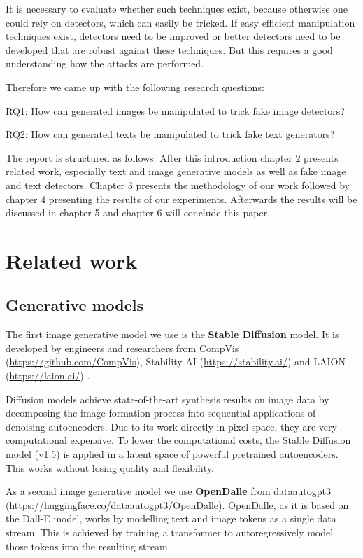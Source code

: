 \documentclass{article} %
\begin{document}
It is necessary to evaluate whether such techniques exist, because otherwise one could rely on detectors, which can easily be tricked. If easy efficient manipulation techniques exist, detectors need to be improved or better detectors need to be developed that are robust against these techniques. But this requires a good understanding how the attacks are performed.

Therefore we came up with the following research questions:


RQ1: How can generated images be manipulated to trick fake image detectors?


RQ2: How can generated texts be manipulated to trick fake text generators?


The report is structured as follows: After this introduction chapter 2 presents related work, especially text and image generative models as well as fake image and text detectors. Chapter 3 presents the methodology of our work followed by chapter 4 presenting the results of our experiments. Afterwards the results will be discussed in chapter 5 and chapter 6 will conclude this paper.

\section{Related work}

\subsection{Generative models}

The first image generative model we use is the \textbf{Stable Diffusion} model. It is developed by engineers and researchers from CompVis (\url{https://github.com/CompVis}), Stability AI (\url{https://stability.ai/}) and LAION (\url{https://laion.ai/}) \cite{patil2022stable}.

Diffusion models achieve state-of-the-art synthesis results on image data by decomposing the image formation process into sequential applications of denoising autoencoders. Due to its work directly in pixel space, they are very computational expensive. To lower the computational costs, the Stable Diffusion model (v1.5) is applied in a latent space of powerful pretrained autoencoders. This works without losing quality and flexibility. \cite{Rombach_2022_CVPR}

As a second image generative model we use \textbf{OpenDalle} from dataautogpt3 (\url{https://huggingface.co/dataautogpt3/OpenDalle}). OpenDalle, as it is based on the Dall-E model, works by modelling text and image tokens as a single data stream. This is achieved by training a transformer to autoregressively model those tokens into the resulting stream.
\end{document}
